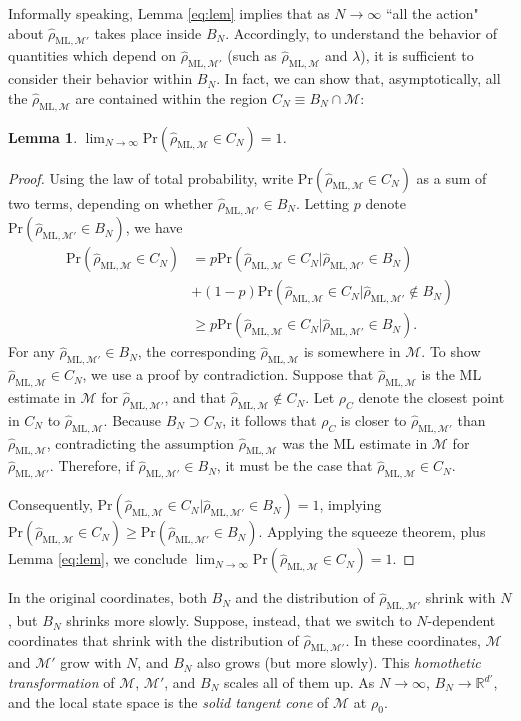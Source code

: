 \documentclass[aps,pra, twocolumn]{revtex4-1}
\newcommand{\M}{\mathcal{M}}
\newcommand{\rhohat}{\hat{\rho}}
\newcommand{\rhoML}[1]{\rhohat_{\scriptscriptstyle{\mathrm{ML},#1}}}
\newtheorem{lem}{Lemma}
\begin{document}
Informally speaking, Lemma \ref{eq:lem} implies that as $N\rightarrow \infty$ ``all the action" about $\rhoML{\M'}$ takes place inside $B_{N}$. Accordingly, to understand the behavior of quantities which depend on $\rhoML{\M'}$ (such as $\rhoML{\M}$ and $\lambda$), it is sufficient to consider their behavior within $B_{N}$. In fact, we can show that, asymptotically, all the $\rhoML{\M}$ are contained within the region $C_{N} \equiv B_{N} \cap \M$:

\begin{lem}
\label{eq:rhoMLlem}
$\lim_{N\rightarrow \infty}\mathrm{Pr}(\rhoML{\M} \in C_{N}) = 1$.
\end{lem}
\begin{proof}
Using the law of total probability, write $\mathrm{Pr}(\rhoML{\M} \in C_{N})$ as a sum of two terms, depending on whether $\rhoML{\M'} \in B_{N}$. Letting $p$ denote $\mathrm{Pr}(\rhoML{\M'} \in B_{N})$, we have
\begin{align*}
\mathrm{Pr}(\rhoML{\M} \in C_{N}) &= p\mathrm{Pr}(\rhoML{\M} \in C_{N} | \rhoML{\M'} \in B_{N})\\
&+(1-p)\mathrm{Pr}(\rhoML{\M} \in C_{N} | \rhoML{\M'} \not\in B_{N})\\
& \geq p\mathrm{Pr}(\rhoML{\M} \in C_{N} | \rhoML{\M'} \in B_{N}).
\end{align*}
For any $\rhoML{\M'} \in B_{N}$, the corresponding $\rhoML{\M}$ is somewhere in $\M$. To show $\rhoML{\M} \in C_{N}$, we use a proof by contradiction. Suppose that $\rhoML{\M}$ is the ML estimate in $\M$ for $\rhoML{\M'}$, and that $\rhoML{\M} \not \in C_{N}$. Let $\rho_{C}$ denote the closest point in $C_{N}$ to $\rhoML{\M}$. Because $B_{N} \supset C_{N}$, it follows that $\rho_{C}$ is closer to $\rhoML{\M'}$ than $\rhoML{\M}$, contradicting the assumption $\rhoML{\M}$ was the ML estimate in $\M$ for $\rhoML{\M'}$. Therefore, if $\rhoML{\M'} \in B_{N}$, it must be the case that $\rhoML{\M} \in C_{N}$.

Consequently, $\mathrm{Pr}(\rhoML{\M} \in C_{N} | \rhoML{\M'} \in B_{N}) = 1$, implying $\mathrm{Pr}(\rhoML{\M} \in C_{N}) \geq \mathrm{Pr}(\rhoML{\M'} \in B_{N})$. Applying the squeeze theorem, plus Lemma \ref{eq:lem}, we conclude $\lim_{N\rightarrow \infty}\mathrm{Pr}(\rhoML{\M} \in C_{N}) = 1$.
\end{proof}

In the original coordinates, both $B_{N}$ and the distribution of $\rhoML{\M'}$ shrink with $N$, but $B_N$ shrinks more slowly.  Suppose, instead, that we switch to $N$-dependent coordinates that shrink with the distribution of $\rhoML{\M'}$.  In these coordinates, $\M$ and $\M'$ grow with $N$, and $B_{N}$ also grows (but more slowly).  This  \emph{homothetic transformation} of $\M$, $\M'$, and $B_{N}$ scales all of them up.  As $N \rightarrow \infty$, $B_{N} \rightarrow \mathbb{R}^{d'}$,  and the local state space is the \emph{solid tangent cone} of $\M$ at $\rho_0$.
\end{document}
